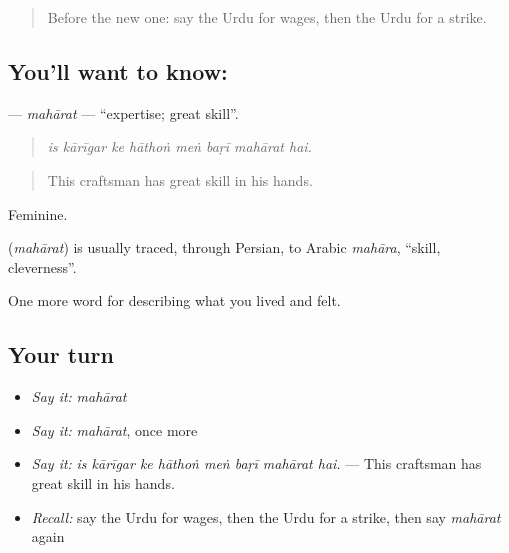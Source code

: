 \label{lesson:UR-C495-maharat}



\begin{quote}
Before the new one: say the Urdu for wages, then the Urdu for a strike.
\end{quote}

\subsection*{You'll want to know: }
\textbf{} — \emph{mahārat} — \textquotedblleft{}expertise; great skill\textquotedblright{}.

\begin{quote}
       
\end{quote}

\begin{quote}
\emph{is kārīgar ke hāthoṅ meṅ baṛī mahārat hai.}
\end{quote}

\begin{quote}
This craftsman has great skill in his hands.
\end{quote}

Feminine.

\begin{cousinweb}
\textbf{} (\emph{mahārat}) is usually traced, through Persian, to Arabic \emph{mahāra}, \textquotedblleft{}skill, cleverness\textquotedblright{}.
\end{cousinweb}

\begin{grammarlens}[title={What you've built}]
One more word for describing what you lived and felt.
\end{grammarlens}

\subsection*{Your turn}
\begin{itemize}
\raggedright
  \item \emph{Say it:} \emph{mahārat}
  \item \emph{Say it:} \emph{mahārat}, once more
  \item \emph{Say it:} \emph{is kārīgar ke hāthoṅ meṅ baṛī mahārat hai.} — This craftsman has great skill in his hands.
  \item \emph{Recall:} say the Urdu for wages, then the Urdu for a strike, then say \emph{mahārat} again
\end{itemize}

